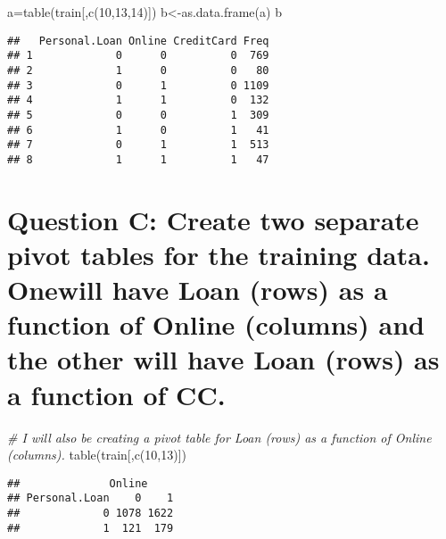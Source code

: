 \documentclass[
]{article}
\newenvironment{Shaded}{\begin{snugshade}}{\end{snugshade}}
\newcommand{\CommentTok}[1]{\textcolor[rgb]{0.56,0.35,0.01}{\textit{#1}}}
\newcommand{\DecValTok}[1]{\textcolor[rgb]{0.00,0.00,0.81}{#1}}
\newcommand{\FunctionTok}[1]{\textcolor[rgb]{0.00,0.00,0.00}{#1}}
\newcommand{\NormalTok}[1]{#1}
\newcommand{\OtherTok}[1]{\textcolor[rgb]{0.56,0.35,0.01}{#1}}
\begin{document}
\begin{Shaded}
\begin{Highlighting}[]
\NormalTok{a}\OtherTok{=}\FunctionTok{table}\NormalTok{(train[,}\FunctionTok{c}\NormalTok{(}\DecValTok{10}\NormalTok{,}\DecValTok{13}\NormalTok{,}\DecValTok{14}\NormalTok{)])}
\NormalTok{b}\OtherTok{\textless{}{-}}\FunctionTok{as.data.frame}\NormalTok{(a)}
\NormalTok{b}
\end{Highlighting}
\end{Shaded}

\begin{verbatim}
##   Personal.Loan Online CreditCard Freq
## 1             0      0          0  769
## 2             1      0          0   80
## 3             0      1          0 1109
## 4             1      1          0  132
## 5             0      0          1  309
## 6             1      0          1   41
## 7             0      1          1  513
## 8             1      1          1   47
\end{verbatim}

\hypertarget{question-c-create-two-separate-pivot-tables-for-the-training-data.-onewill-have-loan-rows-as-a-function-of-online-columns-and-the-other-will-have-loan-rows-as-a-function-of-cc.}{%
\section{Question C: Create two separate pivot tables for the training
data. Onewill have Loan (rows) as a function of Online (columns) and the
other will have Loan (rows) as a function of
CC.}\label{question-c-create-two-separate-pivot-tables-for-the-training-data.-onewill-have-loan-rows-as-a-function-of-online-columns-and-the-other-will-have-loan-rows-as-a-function-of-cc.}}

\begin{Shaded}
\begin{Highlighting}[]
\CommentTok{\# I will also be creating a pivot table for Loan (rows) as a function of Online (columns).}
\FunctionTok{table}\NormalTok{(train[,}\FunctionTok{c}\NormalTok{(}\DecValTok{10}\NormalTok{,}\DecValTok{13}\NormalTok{)])}
\end{Highlighting}
\end{Shaded}

\begin{verbatim}
##              Online
## Personal.Loan    0    1
##             0 1078 1622
##             1  121  179
\end{verbatim}
\end{document}
